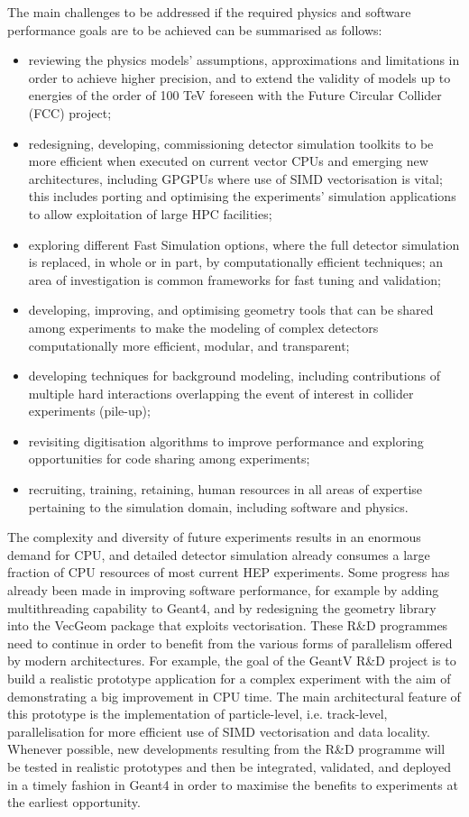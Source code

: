\documentclass[12pt,a4paper]{article}
\begin{document}
The main challenges to be addressed if the required physics and software
performance goals are to be achieved can be summarised as follows:

\begin{itemize}
\item
  reviewing the physics models' assumptions, approximations and
  limitations in order to achieve higher precision, and to extend the
  validity of models up to energies of the order of 100 TeV foreseen
  with the Future Circular Collider (FCC) project;
\item
  redesigning, developing, commissioning detector simulation toolkits to
  be more efficient when executed on current vector CPUs and emerging
  new architectures, including GPGPUs where use of SIMD vectorisation is
  vital; this includes porting and optimising the experiments'
  simulation applications to allow exploitation of large HPC facilities;
\item
  exploring different Fast Simulation options, where the full detector
  simulation is replaced, in whole or in part, by computationally
  efficient techniques; an area of investigation is common frameworks
  for fast tuning and validation;
\item
  developing, improving, and optimising geometry tools that can be
  shared among experiments to make the modeling of complex detectors
  computationally more efficient, modular, and transparent;
\item
  developing techniques for background modeling, including contributions
  of multiple hard interactions overlapping the event of interest in
  collider experiments (pile-up);
\item
  revisiting digitisation algorithms to improve performance and
  exploring opportunities for code sharing among experiments;
\item
  recruiting, training, retaining, human resources in all areas of
  expertise pertaining to the simulation domain, including software and
  physics.
\end{itemize}

The complexity and diversity of future experiments results in an
enormous demand for CPU, and detailed detector simulation already
consumes a large fraction of CPU resources of most current HEP experiments.
Some progress has already been made in improving software performance,
for example by adding multithreading capability to Geant4, and by
redesigning the geometry library into the VecGeom package that exploits
vectorisation. These R\&D programmes need to continue in order to
benefit from the various forms of parallelism offered by modern
architectures. For example, the goal of the GeantV R\&D project is to
build a realistic prototype application for a complex experiment with
the aim of demonstrating a big improvement in CPU time. The main
architectural feature of this prototype is the implementation of
particle-level, i.e. track-level, parallelisation for more efficient use
of SIMD vectorisation and data locality. Whenever possible, new
developments resulting from the R\&D programme will be tested in
realistic prototypes and then be integrated, validated, and deployed in
a timely fashion in Geant4 in order to maximise the benefits to
experiments at the earliest opportunity.
\end{document}
